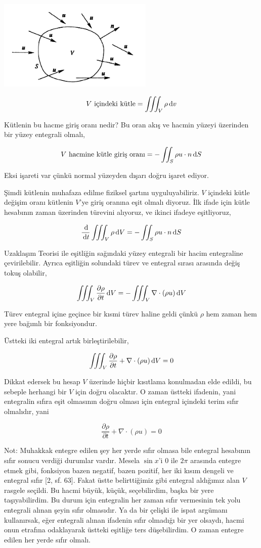 \documentclass[12pt,fleqn]{article}\usepackage{../../common}
\begin{document}
\includegraphics[width=20em]{phy_050_cons_01.png}

$$
V \textrm{ içindeki kütle} = \iiint_V \rho \,\mathrm{d} v
$$

Kütlenin bu hacme giriş oranı nedir? Bu oran akış ve hacmin yüzeyi üzerinden bir
yüzey entegrali olmalı,

$$
V \textrm{ hacmine kütle giriş oranı} = - \iint_S \rho u \cdot n \,\mathrm{d} S
$$

Eksi işareti var çünkü normal yüzeyden dışarı doğru işaret ediyor.

Şimdi kütlenin muhafaza edilme fiziksel şartını uyguluyabiliriz. $V$ içindeki
kütle değişim oranı kütlenin $V$'ye giriş oranına eşit olmalı diyoruz. İlk ifade
için kütle hesabının zaman üzerinden türevini alıyoruz, ve ikinci ifadeye
eşitliyoruz,

$$
\frac{\,\mathrm{d}}{\,\mathrm{d} t}  \iiint_V \rho \,\mathrm{d} V = - \iint_S \rho u \cdot n \,\mathrm{d} S
$$

Uzaklaşım Teorisi ile eşitliğin sağındaki yüzey entegrali bir hacim entegraline
çevirilebilir. Ayrıca eşitliğin solundaki türev ve entegral sırası arasında
değiş tokuş olabilir,

$$
\iiint_V \frac{\partial \rho}{\partial t} \,\mathrm{d} V = - \iiint_V \nabla \cdot (\rho u ) \,\mathrm{d} V
$$

Türev entegral içine geçince bir kısmi türev haline geldi çünkü $\rho$ hem zaman
hem yere bağımlı bir fonksiyondur.

Üstteki iki entegral artık birleştirilebilir,

$$
\iiint_V \frac{\partial \rho}{\partial t} + \nabla \cdot (\rho u ) \,\mathrm{d} V = 0
$$

Dikkat edersek bu hesap $V$ üzerinde hiçbir kısıtlama konulmadan elde edildi,
bu sebeple herhangi bir $V$ için doğru olacaktır. O zaman üstteki ifadenin,
yani entegralin sıfıra eşit olmasının doğru olması için entegral içindeki
terim sıfır olmalıdır, yani 

$$
\frac{\partial \rho}{\partial t} + \nabla \cdot (\rho u ) = 0
$$

Not: Muhakkak entegre edilen şey her yerde sıfır olmasa bile entegral hesabının
sıfır sonucu verdiği durumlar vardır. Mesela $\sin x$'i 0 ile $2\pi$ arasında
entegre etmek gibi, fonksiyon bazen negatif, bazen pozitif, her iki kısım
dengeli ve entegral sıfır [2, sf. 63]. Fakat üstte belirttiğimiz gibi entegral
aldığımız alan $V$ rasgele seçildi. Bu hacmi büyük, küçük, seçebilirdim, başka
bir yere taşıyabilirdim. Bu durum için entegralin her zaman sıfır vermesinin tek
yolu entegrali alınan şeyin sıfır olmasıdır. Ya da bir çelişki ile ispat
argümanı kullanırsak, eğer entegrali alınan ifadenin sıfır olmadığı bir yer
olsaydı, hacmi onun etrafına odaklayarak üstteki eşitliğe ters düşebilirdim. O
zaman entegre edilen her yerde sıfır olmalı.
\end{document}
